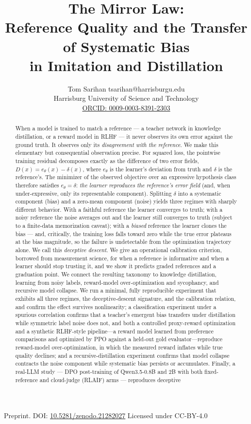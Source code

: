 \documentclass[10pt]{article} %
\title{The Mirror Law:\\ Reference Quality and the Transfer of Systematic Bias\\ in Imitation and Distillation}
\author{\name Tom Sarihan \email tsarihan@harrisburgu.edu \\
      \addr Harrisburg University of Science and Technology \\
      \href{https://orcid.org/0009-0003-8391-2303}{ORCID: 0009-0003-8391-2303}}
\theoremstyle{plain}
\theoremstyle{remark}
\begin{document}
\maketitle

\begin{center}\small
Preprint. DOI: \href{https://doi.org/10.5281/zenodo.21282027}{10.5281/zenodo.21282027} \quad\textbullet\quad Licensed under CC-BY-4.0
\end{center}


\begin{abstract}
When a model is trained to match a reference --- a teacher network in knowledge distillation, or a reward model in RLHF --- it never observes its own error against the ground truth. It observes only its \emph{disagreement with the reference}. We make this elementary but consequential observation precise. For squared loss, the pointwise training residual decomposes exactly as the difference of two error fields, $D(x) = e_\theta(x) - \delta(x)$, where $e_\theta$ is the learner's deviation from truth and $\delta$ is the reference's. The minimizer of the observed objective over an expressive hypothesis class therefore satisfies $e_\theta = \delta$: \emph{the learner reproduces the reference's error field} (and, when under-expressive, only its representable component). Splitting $\delta$ into a systematic component (bias) and a zero-mean component (noise) yields three regimes with sharply different behavior. With a faithful reference the learner converges to truth; with a noisy reference the noise averages out and the learner still converges to truth (subject to a finite-data memorization caveat); with a \emph{biased} reference the learner clones the bias --- and, critically, the training loss falls toward zero while the true error plateaus at the bias magnitude, so the failure is undetectable from the optimization trajectory alone. We call this \emph{deceptive descent}. We give an operational calibration criterion, borrowed from measurement science, for when a reference is informative and when a learner should stop trusting it, and we show it predicts graded references and a graduation point. We connect the resulting taxonomy to knowledge distillation, learning from noisy labels, reward-model over-optimization and sycophancy, and recursive model collapse. We run a minimal, fully reproducible experiment that exhibits all three regimes, the deceptive-descent signature, and the calibration relation, and confirm the effect survives nonlinearity; a classification experiment under a spurious correlation confirms that a teacher's emergent bias transfers under distillation while symmetric label noise does not, and both a controlled proxy-reward optimization and a synthetic RLHF-style pipeline---a reward model learned from preference comparisons and optimized by PPO against a held-out gold evaluator---reproduce reward-model over-optimization, in which the measured reward inflates while true quality declines; and a recursive-distillation experiment confirms that model collapse contracts the noise component while systematic bias persists or accumulates. Finally, a real-LLM study --- DPO post-training of Qwen3.5-0.8B and 2B with both fixed-reference and cloud-judge (RLAIF) arms --- reproduces deceptive 
\end{abstract}
\end{document}
